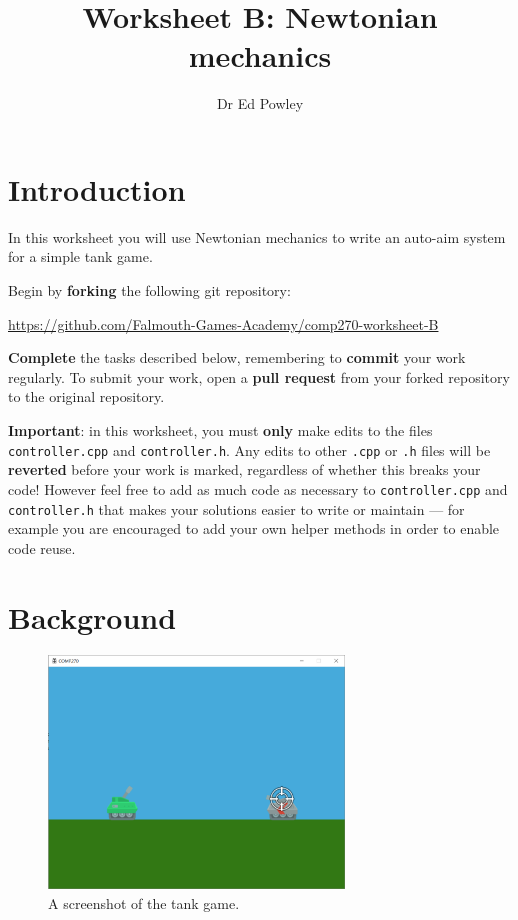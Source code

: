\documentclass{../../../fal_assignment}
\title{Worksheet B: Newtonian mechanics}
\author{Dr Ed Powley}
\begin{document}
\maketitle

\section*{Introduction}

In this worksheet you will use Newtonian mechanics to write an auto-aim system for a simple tank game.

Begin by \textbf{forking} the following git repository:

\begin{center}
	\url{https://github.com/Falmouth-Games-Academy/comp270-worksheet-B}
\end{center}

\textbf{Complete} the tasks described below, remembering to \textbf{commit} your work regularly.
To submit your work, open a \textbf{pull request} from your forked repository to the original repository.

\textbf{Important}: in this worksheet, you must \textbf{only} make edits to the files \texttt{controller.cpp} and \texttt{controller.h}.
Any edits to other \texttt{.cpp} or \texttt{.h} files will be \textbf{reverted} before your work is marked, regardless of whether this breaks your code!
However feel free to add as much code as necessary to \texttt{controller.cpp} and \texttt{controller.h} that makes your solutions easier to write or maintain ---
for example you are encouraged to add your own helper methods in order to enable code reuse.

\section*{Background}

\begin{figure}[ht]
	\begin{center}
		\includegraphics[width=0.7\textwidth]{game}
	\end{center}
	\caption{A screenshot of the tank game.}
	\label{fig:game}
\end{figure}
\end{document}
